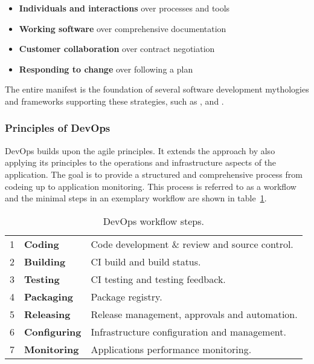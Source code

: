 \documentclass[12pt, a4paper]{article}
\begin{document}
        \begin{itemize}[label=\(\star\)]
            \setlength\itemsep{0em}
            \item \textbf{Individuals and interactions} over processes and tools
            \item \textbf{Working software} over comprehensive documentation
            \item \textbf{Customer collaboration} over contract negotiation
            \item \textbf{Responding to change} over following a plan
        \end{itemize}

        \noindent The entire manifest is the foundation of several software development mythologies and frameworks supporting these strategies, such as ,  and .
        \subsubsection{Principles of DevOps}
        DevOps builds upon the agile principles. It extends the  approach by also applying its principles to the operations and infrastructure aspects of the application. The goal is to provide a structured and comprehensive process from codeing up to application monitoring. This process is referred to as a workflow and the minimal steps in an exemplary workflow are shown in table~\ref{tab::devops_steps}.\newline
        \begin{table}[!h]
            \centering
            \begin{tabularx}{0.85\textwidth}{llX}
                1 & \textbf{Coding}& Code development \& review and source control.  \\
                2 & \textbf{Building}& \acs{CI} build and build status.  \\
                3 & \textbf{Testing}& \acs{CI} testing and testing feedback.  \\
                4 & \textbf{Packaging}& Package registry.  \\
                5 & \textbf{Releasing}& Release management, approvals and automation.  \\
                6 & \textbf{Configuring}& Infrastructure configuration and management.  \\
                7 & \textbf{Monitoring}& Applications performance monitoring.  \\
            \end{tabularx}
            \caption{DevOps workflow steps.}
            \label{tab::devops_steps}
        \end{table}
\end{document}
